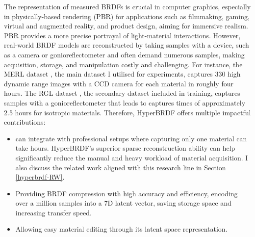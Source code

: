 The representation of measured \gls{BRDF}s is crucial in computer graphics, especially in physically-based rendering (\gls{PBR}) for applications such as filmmaking, gaming, virtual and augmented reality, and product design, aiming for immersive realism. \gls{PBR} provides a more precise portrayal of light-material interactions. However, real-world \gls{BRDF} models are reconstructed by taking samples with a device, such as a camera or gonioreflectometer and often demand numerous samples, making acquisition, storage, and manipulation costly and challenging. For instance, the MERL dataset \cite{Matusik2003jul}, the main dataset I utilised for experiments, captures 330 high dynamic range images with a CCD camera for each material in roughly four hours. The RGL dataset \cite{dupuy2018adaptive}, the secondary dataset included in training, captures samples with a gonioreflectometer that leads to captures times of approximately 2.5 hours for isotropic materials. Therefore, HyperBRDF offers multiple impactful contributions: 
\begin{itemize}
 \item can integrate with professional setups where capturing only one material can take hours. HyperBRDF’s superior sparse reconstruction ability can help significantly reduce the manual and heavy workload of material acquisition. I also discuss the related work aligned with this research line in Section \ref{hyperbrdf-RW}.
 \item Providing \gls{BRDF} compression with high accuracy and efficiency, encoding over a million samples into a 7D latent vector, saving storage space and increasing transfer speed. 
 \item Allowing easy material editing through its latent space representation.
 \end{itemize}
